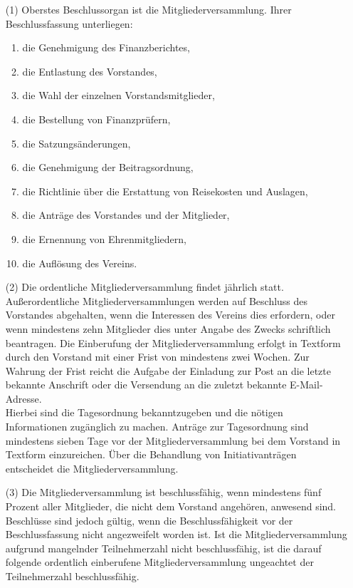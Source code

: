\documentclass[12pt,paper=a4,ngerman]{scrreprt}
\begin{document}
\begin{itemize}
\item[(1)]
Oberstes Beschlussorgan ist die Mitgliederversammlung. Ihrer
Beschlussfassung unterliegen:
\begin{enumerate}
\item die Genehmigung des Finanzberichtes,
\item die Entlastung des Vorstandes,
\item die Wahl der einzelnen Vorstandsmitglieder,
\item die Bestellung von Finanzprüfern,
\item die Satzungsänderungen,
\item die Genehmigung der Beitragsordnung,
\item die Richtlinie über die Erstattung von Reisekosten und Auslagen,
\item die Anträge des Vorstandes und der Mitglieder,
\item die Ernennung von Ehrenmitgliedern,
\item die Auflösung des Vereins.
\end{enumerate}
\item[(2)]
Die ordentliche Mitgliederversammlung findet jährlich statt.
Außerordentliche Mitgliederversammlungen werden auf Beschluss des
Vorstandes abgehalten, wenn die Interessen des Vereins dies erfordern,
oder wenn mindestens zehn Mitglieder dies unter Angabe des Zwecks
schriftlich beantragen. Die Einberufung der Mitgliederversammlung
erfolgt in Textform durch den Vorstand mit einer Frist von mindestens
zwei Wochen. Zur Wahrung der Frist reicht die Aufgabe der Einladung
zur Post an die letzte bekannte Anschrift oder die Versendung an die
zuletzt bekannte E-Mail-Adresse.\\
Hierbei sind die Tagesordnung bekanntzugeben und die nötigen
Informationen zugänglich zu machen. Anträge zur Tagesordnung sind
mindestens sieben Tage vor der Mitgliederversammlung bei dem Vorstand
in Textform einzureichen. Über die Behandlung von Initiativanträgen
entscheidet die Mitgliederversammlung.
\item[(3)]
Die Mitgliederversammlung ist beschlussfähig, wenn mindestens fünf
Prozent aller Mitglieder, die nicht dem Vorstand angehören, anwesend
sind. Beschlüsse sind jedoch gültig, wenn die Beschlussfähigkeit vor
der Beschlussfassung nicht angezweifelt worden ist. Ist die
Mitgliederversammlung aufgrund mangelnder Teilnehmerzahl nicht
beschlussfähig, ist die darauf folgende ordentlich einberufene
Mitgliederversammlung ungeachtet der Teilnehmerzahl beschlussfähig.

\end{itemize}
\end{document}
